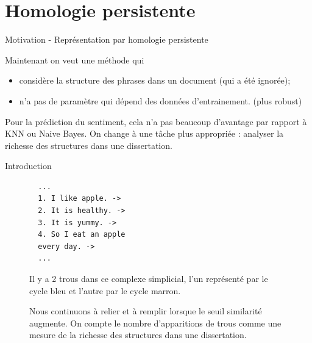\documentclass{beamer}
\begin{document}
\section{Homologie persistente}

\begin{frame}{Motivation - Représentation par homologie persistente}

Maintenant on veut une méthode qui

\begin{itemize}
    \item considère la structure des phrases
dans un document (qui a été ignorée);
    \item n'a pas de paramètre qui dépend des données d'entrainement. (plus robust)
\end{itemize}

Pour la prédiction du sentiment, cela n'a pas beaucoup d'avantage par rapport à KNN ou Naive Bayes. On change à une tâche plus appropriée : analyser la richesse des structures dans une dissertation.

\end{frame}

\begin{frame}{Introduction}
\begin{figure}[H]
  \begin{minipage}{0.49\textwidth}
  \scalebox{0.45}{}
  \end{minipage}
  \begin{minipage}{0.49\textwidth}
  \begin{verbatim}
  ...
  1. I like apple. ->
  2. It is healthy. ->
  3. It is yummy. ->
  4. So I eat an apple
  every day. ->
  ...
  \end{verbatim}
  \end{minipage}
  \caption{Il y a 2 trous dans ce complexe simplicial,
  l'un représenté par le cycle bleu et l'autre par le cycle marron.}
  \label{apple}
\end{figure}
\begin{figure}[H]
\centering

\caption{Nous continuons à relier et à remplir lorsque le seuil similarité augmente. \textbullet On compte le nombre d'apparitions de trous comme une mesure de la richesse des structures dans une dissertation.}
\label{filtration}
\end{figure}
\end{frame}
\end{document}
